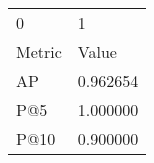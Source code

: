 \begin{tabular}{ll}
0 & 1 \\
Metric & Value \\
AP & 0.962654 \\
P@5 & 1.000000 \\
P@10 & 0.900000 \\
\end{tabular}
